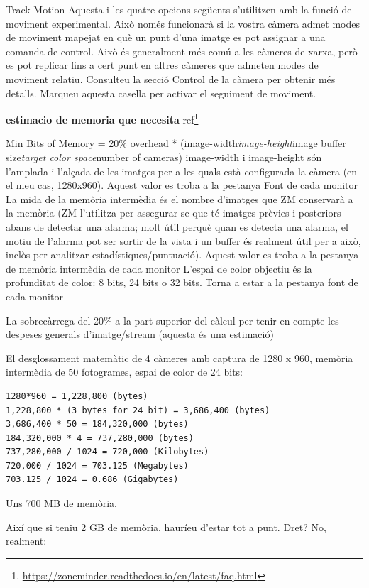 \documentclass[
  10pt,
]{krantz}
\DeclareRobustCommand{\href}[2]{#2\footnote{\url{#1}}}
\begin{document}
Track Motion Aquesta i les quatre opcions següents s'utilitzen amb la funció de moviment experimental. Això només funcionarà si la vostra càmera admet modes de moviment mapejat en què un punt d'una imatge es pot assignar a una comanda de control. Això és generalment més comú a les càmeres de xarxa, però es pot replicar fins a cert punt en altres càmeres que admeten modes de moviment relatiu. Consulteu la secció Control de la càmera per obtenir més detalls. Marqueu aquesta casella per activar el seguiment de moviment.

\textbf{estimacio de memoria que necesita} \href{https://zoneminder.readthedocs.io/en/latest/faq.html}{ref}

Min Bits of Memory = 20\% overhead * (image-width\emph{image-height}image buffer size\emph{target color space}number of cameras) image-width i image-height són l'amplada i l'alçada de les imatges per a les quals està configurada la càmera (en el meu cas, 1280x960). Aquest valor es troba a la pestanya Font de cada monitor La mida de la memòria intermèdia és el nombre d'imatges que ZM conservarà a la memòria (ZM l'utilitza per assegurar-se que té imatges prèvies i posteriors abans de detectar una alarma; molt útil perquè quan es detecta una alarma, el motiu de l'alarma pot ser sortir de la vista i un buffer és realment útil per a això, inclòs per analitzar estadístiques/puntuació). Aquest valor es troba a la pestanya de memòria intermèdia de cada monitor L'espai de color objectiu és la profunditat de color: 8 bits, 24 bits o 32 bits. Torna a estar a la pestanya font de cada monitor

La sobrecàrrega del 20\% a la part superior del càlcul per tenir en compte les despeses generals d'imatge/stream (aquesta és una estimació)

El desglossament matemàtic de 4 càmeres amb captura de 1280 x 960, memòria intermèdia de 50 fotogrames, espai de color de 24 bits:

\begin{verbatim}
1280*960 = 1,228,800 (bytes)
1,228,800 * (3 bytes for 24 bit) = 3,686,400 (bytes)
3,686,400 * 50 = 184,320,000 (bytes)
184,320,000 * 4 = 737,280,000 (bytes)
737,280,000 / 1024 = 720,000 (Kilobytes)
720,000 / 1024 = 703.125 (Megabytes)
703.125 / 1024 = 0.686 (Gigabytes)
\end{verbatim}

Uns 700 MB de memòria.

Així que si teniu 2 GB de memòria, hauríeu d'estar tot a punt. Dret? No, realment:
\end{document}
